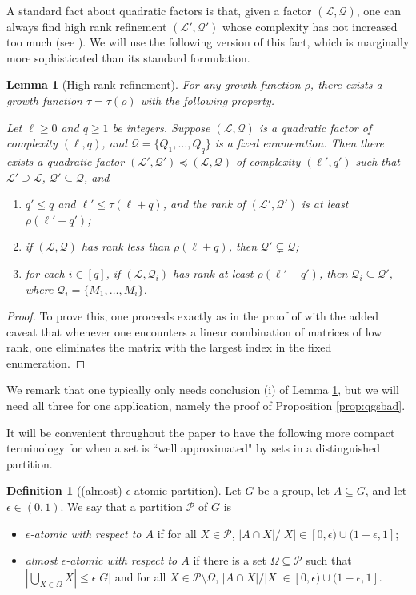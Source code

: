 \documentclass[12pt,oneside,british,a4wide]{amsart}
\newtheorem{lemma}[theorem]{Lemma}
\numberwithin{equation}{section}
\theoremstyle{definition}
\newtheorem{definition}[theorem]{Definition}
\def\e{\epsilon}
\newcommand{\calL}{\mathcal{L}}
\newcommand{\calP}{\mathcal{P}}
\newcommand{\calQ}{\mathcal{Q}}
\begin{document}
 A standard fact about quadratic factors is that, given a factor $(\calL,\calQ)$, one can always find high rank refinement $(\calL',\calQ')$ whose complexity has not increased too much (see \cite[Lemma 3.11]{Green.2007}).  We will use the following version of this fact, which is marginally more sophisticated than its standard formulation.

\begin{lemma}[High rank refinement]\label{lem:rank}
For any growth function $\rho$, there exists a growth function $\tau=\tau(\rho)$ with the following property. 

Let $\ell\geq 0$ and $q\geq 1$ be integers.  Suppose $(\calL,\calQ)$ is a quadratic factor of complexity $(\ell,q)$, and $\calQ=\{Q_1,\ldots, Q_q\}$ is a fixed enumeration. Then there exists a quadratic factor $(\calL',\calQ')\preceq (\calL,\calQ)$ of complexity $(\ell',q')$ such that $\calL'\supseteq \calL$, $\calQ'\subseteq \calQ$, and 
\begin{enumerate}[label=\normalfont(\roman*)] 
\item $q'\leq q$ and $\ell' \leq \tau(\ell+q)$, and the rank of $(\calL',\calQ')$ is at least $\rho(\ell'+q')$;
\item if $(\calL,\calQ)$ has rank less than $\rho(\ell+q)$, then $\calQ'\subsetneq \calQ$;\label{start}
\item for each $i\in [q]$, if $(\calL,\calQ_i)$ has rank at least $\rho(\ell'+q')$, then $\calQ_i\subseteq \calQ'$, where $\calQ_i=\{M_1,\ldots, M_i\}$.  \label{keep}
\end{enumerate}
\end{lemma}
\begin{proof}
To prove this, one proceeds exactly as in the proof of \cite[Lemma 3.11]{Green.2007} with the added caveat that whenever one encounters a linear combination of matrices of low rank, one eliminates the matrix with the largest index in the fixed enumeration. 
\end{proof}

We remark that one typically only needs  conclusion (i) of Lemma \ref{lem:rank}, but we will need all three for one application, namely the proof of Proposition \ref{prop:qgsbad}.

It will be convenient throughout the paper to have the following more compact terminology for when a set is ``well approximated" by sets in a distinguished partition.  

\begin{definition}[(almost) $\e$-atomic partition]
Let $G$ be a group, let $A\subseteq G$, and let $\e\in (0,1)$. We say that a partition $\calP$ of $G$ is
\begin{itemize}
\item \emph{$\e$-atomic with respect to $A$} if  for all $X\in \calP$, $|A\cap X|/|X|\in [0,\e)\cup (1-\e,1]$;
\item \emph{almost $\e$-atomic with respect to $A$} if there is a set $\Omega\subseteq \calP$ such that $|\bigcup_{X\in \Omega}X|\leq \e|G|$ and for all $X\in \calP\setminus \Omega$, $|A\cap X|/|X|\in [0,\e)\cup (1-\e,1]$.
\end{itemize}
\end{definition}
\end{document}
